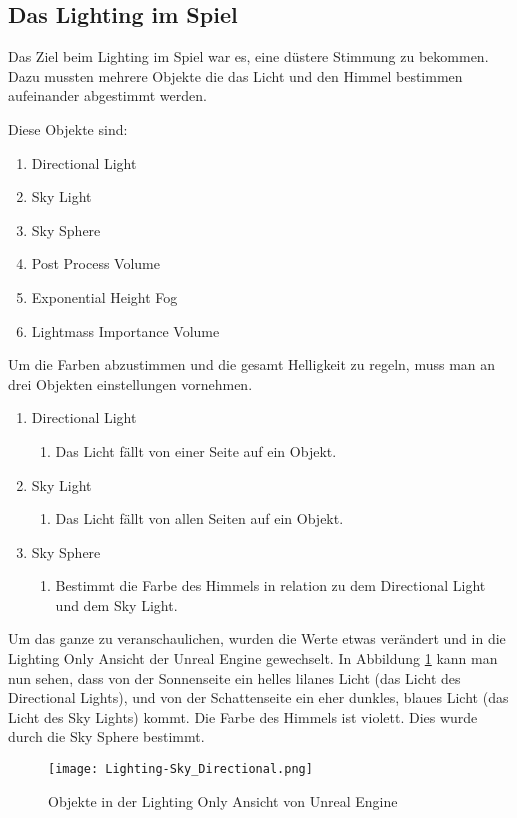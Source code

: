 \subsection{Das Lighting im Spiel}
Das Ziel beim Lighting im Spiel war es, eine düstere Stimmung zu bekommen. Dazu mussten mehrere Objekte die das Licht und den Himmel bestimmen aufeinander abgestimmt werden.

Diese Objekte sind:
\begin{enumerate}
    \item Directional Light
    \item Sky Light
    \item Sky Sphere
    \item Post Process Volume
    \item Exponential Height Fog
    \item Lightmass Importance Volume
\end{enumerate}

Um die Farben abzustimmen und die gesamt Helligkeit zu regeln, muss man an drei Objekten einstellungen vornehmen.
\begin{enumerate}
    \item Directional Light
    \begin{enumerate}
              \item Das Licht fällt von einer Seite auf ein Objekt.
    \end{enumerate}
    \item Sky Light
    \begin{enumerate}
        \item Das Licht fällt von allen Seiten auf ein Objekt.
    \end{enumerate}
    \item Sky Sphere
    \begin{enumerate}
        \item Bestimmt die Farbe des Himmels in relation zu dem Directional Light und dem Sky Light.
    \end{enumerate}
\end{enumerate}

Um das ganze zu veranschaulichen, wurden die Werte etwas verändert und in die Lighting Only Ansicht der Unreal Engine gewechselt.
In Abbildung \ref{lighting:Lighting-Sky_Directional} kann man nun sehen,
dass von der Sonnenseite ein helles lilanes Licht (das Licht des Directional Lights), und von der Schattenseite ein eher dunkles, blaues Licht
(das Licht des Sky Lights) kommt.
Die Farbe des Himmels ist violett. Dies wurde durch die Sky Sphere bestimmt.
\begin{figure}[h]
    \centering
    \texttt{[image: Lighting-Sky\_Directional.png]}
    \caption{Objekte in der Lighting Only Ansicht von Unreal Engine}
    \label{lighting:Lighting-Sky_Directional}
\end{figure}

